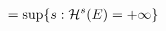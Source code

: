 \documentclass[preview]{standalone}
\begin{document}
\begin{align*}
= \sup\{ s : \mathcal{H}^s(E) = + \infty \}  \hspace{2.65 cm}
\end{align*}
\end{document}
